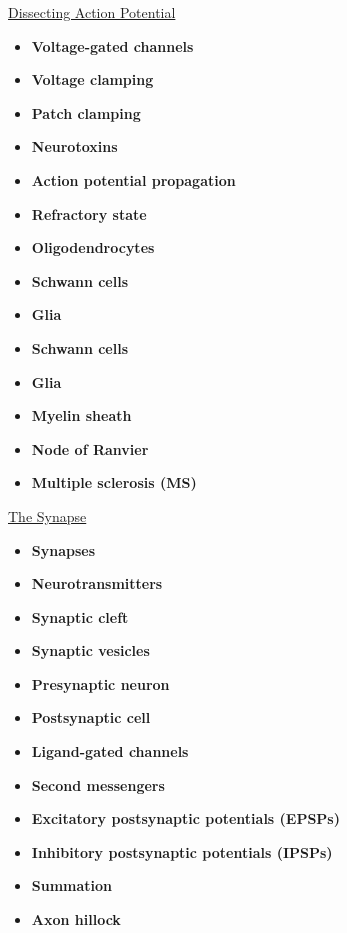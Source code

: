 \documentclass[12pt,letterpaper]{article}
\begin{document}
\hypertarget{43.2}{}
\begin{secbox}{\hyperlink{43}{Dissecting Action Potential}}{
    \begin{itemize}
        \item \textbf{Voltage-gated channels}
        \item \textbf{Voltage clamping}
        \item \textbf{Patch clamping}
        \item \textbf{Neurotoxins}
        \item \textbf{Action potential propagation}
        \item \textbf{Refractory state}
        \item \textbf{Oligodendrocytes}
        \item \textbf{Schwann cells }
        \item \textbf{Glia}
        \item \textbf{Schwann cells }
        \item \textbf{Glia}
        \item \textbf{Myelin sheath}
        \item \textbf{Node of Ranvier}
        \item \textbf{Multiple sclerosis (MS)}
    \end{itemize}
}\end{secbox}

\hypertarget{43.3}{}
\begin{secbox}{\hyperlink{43}{The Synapse}}{
    \begin{itemize}
        \item \textbf{Synapses}
        \item \textbf{Neurotransmitters}
        \item \textbf{Synaptic cleft}
        \item \textbf{Synaptic vesicles}
        \item \textbf{Presynaptic neuron}
        \item \textbf{Postsynaptic cell}
        \item \textbf{Ligand-gated channels}
        \item \textbf{Second messengers}
        \item \textbf{Excitatory postsynaptic potentials (EPSPs)}
        \item \textbf{Inhibitory postsynaptic potentials (IPSPs)}
        \item \textbf{Summation}
        \item \textbf{Axon hillock}
    \end{itemize}
}\end{secbox}
\end{document}
